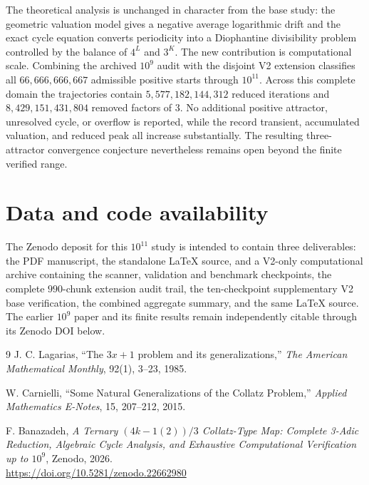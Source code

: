 \documentclass[11pt]{article}
\begin{document}
The theoretical analysis is unchanged in character from the base study: the geometric valuation model gives a negative average logarithmic drift and the exact cycle equation converts periodicity into a Diophantine divisibility problem controlled by the balance of $4^L$ and $3^K$.  The new contribution is computational scale.  Combining the archived $10^9$ audit with the disjoint V2 extension classifies all $66,666,666,667$ admissible positive starts through $10^{11}$.  Across this complete domain the trajectories contain $5,577,182,144,312$ reduced iterations and $8,429,151,431,804$ removed factors of $3$.  No additional positive attractor, unresolved cycle, or overflow is reported, while the record transient, accumulated valuation, and reduced peak all increase substantially.  The resulting three-attractor convergence conjecture nevertheless remains open beyond the finite verified range.

\section*{Data and code availability}
The Zenodo deposit for this $10^{11}$ study is intended to contain three deliverables: the PDF manuscript, the standalone LaTeX source, and a V2-only computational archive containing the scanner, validation and benchmark checkpoints, the complete $990$-chunk extension audit trail, the ten-checkpoint supplementary V2 base verification, the combined aggregate summary, and the same LaTeX source.  The earlier $10^9$ paper and its finite results remain independently citable through its Zenodo DOI below.

\begin{thebibliography}{9}\sloppy
{}
J. C. Lagarias,
``The $3x+1$ problem and its generalizations,''
\emph{The American Mathematical Monthly}, 92(1), 3--23, 1985.

W. Carnielli,
``Some Natural Generalizations of the Collatz Problem,''
\emph{Applied Mathematics E-Notes}, 15, 207--212, 2015.

F. Banazadeh,
\emph{A Ternary $(4k-1(2))/3$ Collatz-Type Map: Complete 3-Adic Reduction, Algebraic Cycle Analysis, and Exhaustive Computational Verification up to $10^9$},
Zenodo, 2026.\\
\url{https://doi.org/10.5281/zenodo.22662980}

\end{thebibliography}
\end{document}
